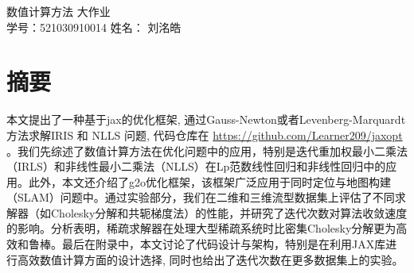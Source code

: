 \documentclass{ctexart}
\begin{document}





\begin{center}
	\Large{数值计算方法 大作业} \\
	\normalsize{学号：521030910014}
	\normalsize{姓名： 刘{洺}皓}
	\vspace{0.4cm}
\end{center}

\section{摘要}
本文提出了一种基于jax的优化框架, 通过Gauss-Newton或者Levenberg-Marquardt方法求解IRIS 和 NLLS 问题, 代码仓库在 \url{https://github.com/Learner209/jaxopt} 。我们先综述了数值计算方法在优化问题中的应用，特别是迭代重加权最小二乘法（IRLS）和非线性最小二乘法（NLLS）在Lp范数线性回归和非线性回归中的应用。此外，本文还介绍了g2o优化框架，该框架广泛应用于同时定位与地图构建（SLAM）问题中。通过实验部分，我们在二维和三维流型数据集上评估了不同求解器（如Cholesky分解和共轭梯度法）的性能，并研究了迭代次数对算法收敛速度的影响。分析表明，稀疏求解器在处理大型稀疏系统时比密集Cholesky分解更为高效和鲁棒。最后在附录中，本文讨论了代码设计与架构，特别是在利用JAX库进行高效数值计算方面的设计选择, 同时也给出了迭代次数在更多数据集上的实验。
\end{document}
